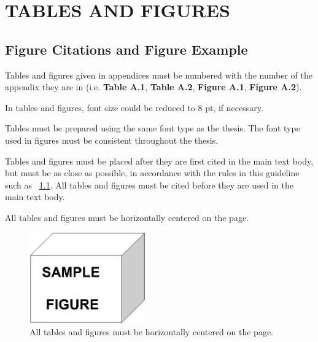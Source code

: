 \chapter{TABLES AND FIGURES}\label{CH2}

\vspace{-12pt} %

\section{Figure Citations and Figure Example}

Tables and figures given in appendices must be numbered with the number of the appendix they are in (i.e. \textbf{Table A.1}, \textbf{Table A.2}, \textbf{Figure A.1}, \textbf{Figure A.2}).

In tables and figures, font size could be reduced to 8 pt, if necessary.

Tables must be prepared using the same font type as the thesis. The font type used in figures must be consistent throughout the thesis.

Tables and figures must be placed after they are first cited in the main text body, but must be as close as possible, in accordance with the rules in this guideline such as \figurename\ \ref{fig:ch2-1}. All tables and figures must be cited before they are used in the main text body.

All tables and figures must be horizontally centered on the page.

\vspace{6pt} %
\begin{figure}[!ht]
    \centering
    \includegraphics[width=5cm,keepaspectratio=true]{./fig/sekil1.png}
    \caption{All tables and figures must be horizontally centered on the page.}
    \label{fig:ch2-1}
\end{figure}
\vspace{-9pt} %

